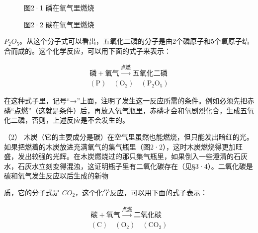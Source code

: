 \begin{figure}
\centering
\caption{图2·1 磷在氧气里燃烧}
\end{figure}

\begin{figure}
\centering
\caption{图2·2 碳在氧气里燃烧}
\end{figure}

\(P_{2}O_{5}\)。从这个分子式可以看出，五氧化二磷的分子是由2个磷原子和5个氧原子结合而成的。这个化学反应，可以用下面的式子来表示：

\[
\begin{array}{c} \text{磷} + \text{氧气} \xrightarrow {\text{点燃}} \text{五氧化二磷} \\ (\mathrm{P}) \quad (\mathrm{O}_{2}) \quad (\mathrm{P}_{2} \mathrm{O}_{5}) \end{array}
\]

在这种式子里，记号``→''上面，注明了发生这一反应所需的条件。例如必须先把赤磷``点燃''（这就是条件）后，再放入氧气瓶里，赤磷才会和氧剧烈化合，生成五氧化二磷，否则，上述反应是不会发生的。

（2）
木炭（它的主要成分是碳）在空气里虽然也能燃烧，但只能发出暗红的光。如果把燃着的木炭放进充满氧气的集气瓶里（图2·2），这时木炭燃烧得更加旺盛，发出较强的光辉。在木炭燃烧过的那只集气瓶里，如果倒入一些澄清的石灰水，石灰水立刻变得混浊，这证明瓶子里有二氧化碳存在（见§3·4）。二氧化碳是碳和氧气发生反应以后生成的新物

质，它的分子式是 \(CO_{2}\)，这个化学反应，可以用下面的式子表示：

\[
\begin{array}{c} \text{碳} + \text{氧气} \xrightarrow {\text{点燃}} \text{二氧化碳} \\ (\mathrm{C}) \quad (\mathrm{O}_{2}) \quad (\mathrm{CO}_{2}) \end{array}
\]

